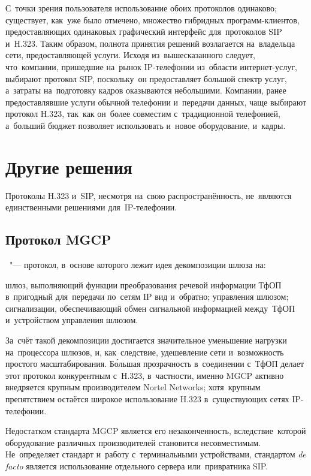 С~точки зрения пользователя использование обоих протоколов одинаково; существует, как~уже было отмечено, множество гибридных программ-клиентов, предоставляющих одинаковых графический интерфейс для~протоколов SIP и~H.323.
Таким образом, полнота принятия решений возлагается на~владельца сети, предоставляющей услуги.
Исходя из~вышесказанного следует, что~компании, пришедшие на~рынок IP-телефонии из~области интернет-услуг, выбирают протокол SIP, поскольку~он предоставляет большой спектр услуг, а~затраты на~подготовку кадров оказываются небольшими.
Компании, ранее предоставлявшие услуги обычной телефонии и~передачи данных, чаще выбирают протокол H.323, так~как он~более совместим с~традиционной телефонией, а~больший бюджет позволяет использовать и~новое оборудование, и~кадры.

\section{Другие решения}

Протоколы H.323 и~SIP, несмотря на~свою распространённость, не~являются единственными решениями для~IP-телефонии.

\subsection{Протокол MGCP}

~"--- протокол, в~основе которого лежит идея декомпозиции шлюза на:
\begin{enumerate}
     шлюз, выполняющий функции преобразования речевой информации ТфОП в~пригодный для~передачи по~сетям IP вид и~обратно;
		 управления шлюзом;
		 сигнализации, обеспечивающий обмен сигнальной информацией между~ТфОП и~устройством управления шлюзом.
\end{enumerate}

За~счёт такой декомпозиции достигается значительное уменьшение нагрузки на~процессора шлюзов, и, как~следствие, удешевление сети и~возможность простого масштабирования.
Б\'{о}льшая прозрачность в~соединении с~ТфОП делает этот протокол конкурентным с~H.323, в~частности, именно MGCP активно внедряется крупным производителем Nortel Networks;
хотя~крупным препятствием остаётся широкое использование H.323 в~существующих сетях IP-телефонии.

Недостатком стандарта MGCP является его незаконченность, вследствие~которой оборудование различных производителей становится несовместимым.
Не~определяет стандарт и~работу с~терминальными устройствами, стандартом \emph{de facto} является использование отдельного сервера или~привратника SIP.

